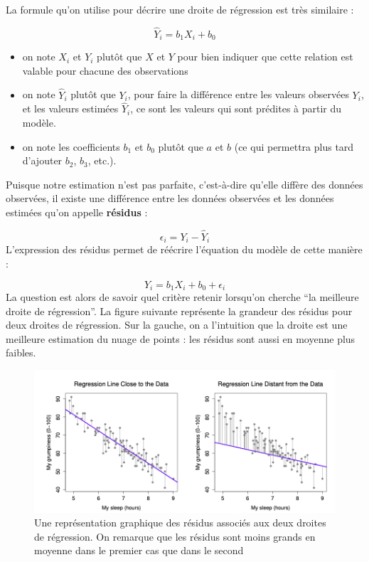 \documentclass[
]{book}
\providecommand{\tightlist}{%
  \setlength{\itemsep}{0pt}\setlength{\parskip}{0pt}}
\begin{document}
La formule qu'on utilise pour décrire une droite de régression est très
similaire :

\[ \hat{Y}_i = b_1X_i + b_0\]

\begin{itemize}
\tightlist
\item
  on note \(X_i\) et \(Y_i\) plutôt que \(X\) et \(Y\) pour bien indiquer que cette relation est valable pour chacune des observations
\item
  on note \(\hat{Y}_i\) plutôt que \(Y_i\), pour faire la différence entre les valeurs observées \(Y_i\), et les valeurs estimées \(\hat{Y}_i\), ce sont les valeurs qui sont prédites à partir du modèle.
\item
  on note les coefficients \(b_1\) et \(b_0\) plutôt que \(a\) et \(b\) (ce qui permettra plus tard d'ajouter \(b_2\), \(b_3\), etc.).
\end{itemize}

Puisque notre estimation n'est pas parfaite, c'est-à-dire qu'elle
diffère des données observées, il existe une différence entre les
données observées et les données estimées qu'on appelle \textbf{résidus} :

\[ \epsilon_i = Y_i - \hat{Y}_i\]
L'expression des résidus permet de réécrire l'équation du modèle de cette manière :

\[ Y_i = b_1X_i + b_0 + \epsilon_i \]
La question est alors de savoir quel critère retenir lorsqu'on cherche ``la meilleure droite de régression''. La figure suivante représente la grandeur des résidus pour deux droites de régression. Sur la gauche, on a l'intuition que la droite est une meilleure estimation du nuage de points : les résidus sont aussi en moyenne plus faibles.

\begin{figure}
\includegraphics[width=12.44in]{images/residuals} \caption{Une représentation graphique des résidus associés aux deux droites de régression. On remarque que les résidus sont moins grands en moyenne dans le premier cas que dans le second}\label{fig:residus}
\end{figure}
\end{document}

